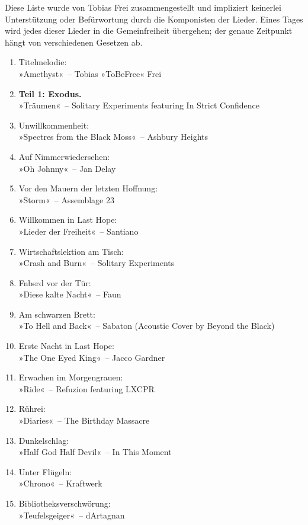 Diese Liste wurde von Tobias Frei zusammengestellt und impliziert keinerlei Unterstützung oder Befürwortung durch die Komponisten der Lieder. Eines Tages wird jedes dieser Lieder in die Gemeinfreiheit übergehen; der genaue Zeitpunkt hängt von verschiedenen Gesetzen ab.

\begin{enumerate}
    \item Titelmelodie:\\ »Amethyst«~– Tobias »ToBeFree« Frei
    \item \textbf{Teil 1: Exodus.}\\ »Träumen«~– Solitary Experiments featuring In Strict Confidence
    \item Unwillkommenheit:\\ »Spectres from the Black Moss«~– Ashbury Heights
    \item Auf Nimmerwiedersehen:\\ »Oh Johnny«~– Jan Delay
    \item Vor den Mauern der letzten Hoffnung:\\ »Storm«~– Assemblage 23
    \item Willkommen in Last Hope:\\ »Lieder der Freiheit«~– Santiano
    \item Wirtschaftslektion am Tisch:\\ »Crash and Burn«~– Solitary Experiments
    \item Fnbsrd vor der Tür:\\ »Diese kalte Nacht«~– Faun
    \item Am schwarzen Brett:\\ »To Hell and Back«~– Sabaton (Acoustic Cover by Beyond the Black)
    \item Erste Nacht in Last Hope:\\ »The One Eyed King«~– Jacco Gardner
    \item Erwachen im Morgengrauen:\\ »Ride«~– Refuzion featuring LXCPR
    \item Rührei:\\ »Diaries«~– The Birthday Massacre
    \item Dunkelschlag:\\ »Half God Half Devil«~– In This Moment
    \item Unter Flügeln:\\ »Chrono«~– Kraftwerk
    \item Bibliotheksverschwörung:\\ »Teufelsgeiger«~– dArtagnan

\end{enumerate}
